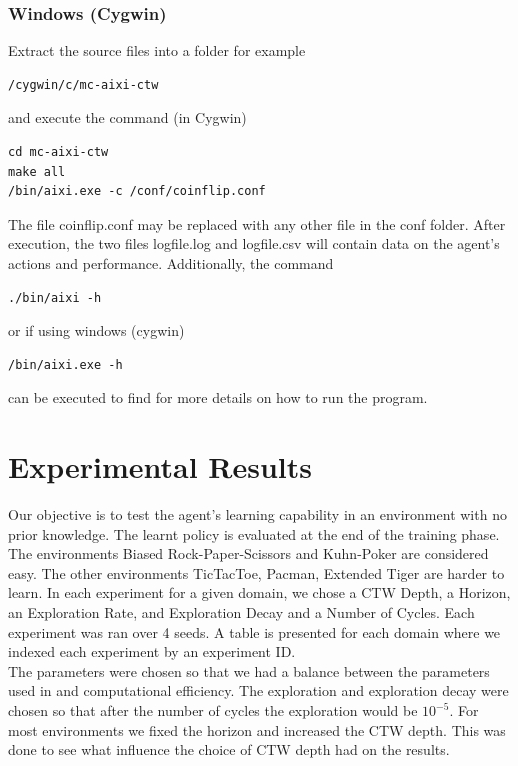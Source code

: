 \documentclass{article}
\theoremstyle{definition}
\newtheorem{primary statistics}[definition]{Primary Statistics}
\newtheorem{auxiliary statistics}[definition]{Auxiliary Statistics}
\begin{document}
\subsubsection*{Windows (Cygwin)}
Extract the source files into a folder for example
\begin{lstlisting}[style=DOS]
 /cygwin/c/mc-aixi-ctw 
\end{lstlisting}
and execute the command (in Cygwin)
\begin{lstlisting}[style=DOS]
cd mc-aixi-ctw
make all
/bin/aixi.exe -c /conf/coinflip.conf
\end{lstlisting} 

The file coinflip.conf may be replaced with any other file in the conf folder. 
After execution, the two files logfile.log and logfile.csv will contain data on the agent’s actions and performance. Additionally, the command
\begin{lstlisting}[style=DOS]
./bin/aixi -h
\end{lstlisting}
or if using windows (cygwin)
\begin{lstlisting}[style=DOS]
/bin/aixi.exe -h
\end{lstlisting}
can be executed to find for more details on how to run the program.




\section{Experimental Results}

Our objective is to test the agent's learning capability in an environment with no prior knowledge. The learnt policy is evaluated at the end of the training phase. The environments Biased Rock-Paper-Scissors and Kuhn-Poker are considered easy. The other environments TicTacToe, Pacman, Extended Tiger are harder to learn. In each experiment for a given domain, we chose a CTW Depth, a Horizon, an Exploration Rate, and Exploration Decay and a Number of Cycles. Each experiment was ran over 4 seeds. A table is presented for each domain where we indexed each experiment by an experiment ID. \\

The parameters were chosen so that we had a balance between the parameters used in \citep{veness2011monte} and computational efficiency. The exploration and exploration decay were chosen so that after the number of cycles the exploration would be $10^{-5}$. For most environments we fixed the horizon and increased the CTW depth. This was done to see what influence the choice of CTW depth had on the results. \\
\end{document}
